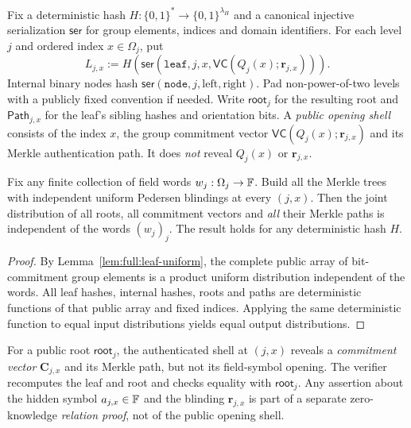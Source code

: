 \begin{definition}\label{def:full:merkle}
Fix a deterministic hash
$H:\{0,1\}^*\to\{0,1\}^{\lambda_H}$
and a canonical injective serialization
$\mathsf{ser}$ for group elements, indices and
domain identifiers. For each level $j$ and
ordered index $x\in\Omega_j$, put
\[
 L_{j,x}:=H(\mathsf{ser}(\texttt{leaf},j,x,
                        \mathsf{VC}(Q_j(x);\mathbf r_{j,x}))).
\]
Internal binary nodes hash
$\mathsf{ser}(\texttt{node},j,\text{left},\text{right})$.
Pad non-power-of-two levels with a publicly
fixed convention if needed. Write $\mathsf{root}_j$
for the resulting root and
$\mathsf{Path}_{j,x}$ for the leaf's sibling hashes
and orientation bits. A \emph{public opening shell}
consists of the index $x$, the group commitment
vector $\mathsf{VC}(Q_j(x);\mathbf r_{j,x})$
and its Merkle authentication path.
It does \emph{not} reveal $Q_j(x)$ or
$\mathbf r_{j,x}$.
\end{definition}

\begin{lemma}\label{lem:full:merkle-shell}
Fix any finite collection of field words
$w_j:\Omega_j\to\mathbb{F}$. Build all the Merkle
trees with independent uniform Pedersen
blindings at every $(j,x)$.
Then the joint distribution of all roots,
all commitment vectors and \emph{all} their
Merkle paths is independent of the words
$(w_j)_j$. The result holds for any
deterministic hash $H$.
\end{lemma}
\begin{proof}
By Lemma~\ref{lem:full:leaf-uniform},
the complete public array of bit-commitment
group elements is a product uniform
distribution independent of the words.
All leaf hashes, internal hashes, roots
and paths are deterministic functions of
that public array and fixed indices.
Applying the same deterministic function
to equal input distributions yields equal
output distributions.
\end{proof}

\begin{definition}\label{def:full:auth-commit}
For a public root $\mathsf{root}_j$,
the authenticated shell at $(j,x)$
reveals a \emph{commitment vector}
$\mathbf C_{j,x}$ and its Merkle path,
but not its field-symbol opening. The verifier recomputes
the leaf and root and checks equality with
$\mathsf{root}_j$.
Any assertion about the hidden symbol
$a_{j,x}\in\mathbb{F}$ and the blinding $\mathbf r_{j,x}$
is part of a separate zero-knowledge
\emph{relation proof}, not of the
public opening shell.
\end{definition}

